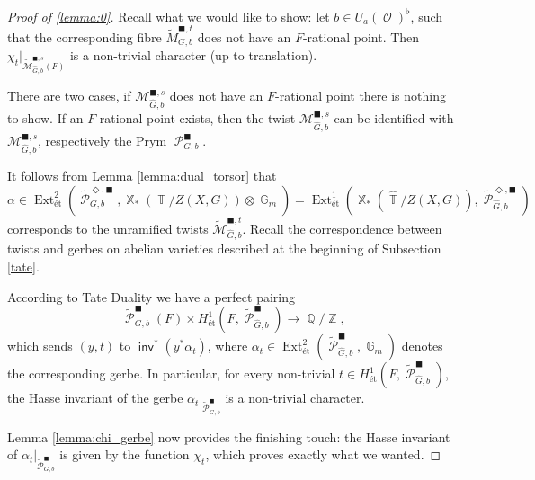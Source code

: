 \documentclass{article}
\DeclareMathOperator{\inv}{\mathsf{inv}}
\DeclareMathOperator{\Zb}{\mathbb{Z}}
\DeclareMathOperator{\Xb}{\mathbb{X}}
\DeclareMathOperator{\G}{\mathbb{G}}
\DeclareMathOperator{\Tb}{\mathbb{T}}
\newcommand{\Mc}{\mathcal{M}}
\DeclareMathOperator{\Pc}{\mathcal{P}}
\DeclareMathOperator{\Oo}{\mathcal{O}}
\DeclareMathOperator{\Qb}{\mathbb{Q}}
\DeclareMathOperator{\Ext}{Ext}
\theoremstyle{definition}
\theoremstyle{plain}
\newtheorem{lemma}[definition]{Lemma}
\begin{document}

\begin{proof}[Proof of \ref{lemma:0}]
Recall what we would like to show: let $b \in U_a(\Oo)^{\flat}$, such that the corresponding fibre $\widetilde{M}^{\blacksquare,t}_{G,b}$ does not have an $F$-rational point. Then $\chi_t|_{\widetilde{\Mc}^{\blacksquare,s}_{\widehat{G},b}(F)}$ is a non-trivial character (up to translation).

There are two cases, if $\Mc^{\blacksquare,s}_{\widehat{G},b}$ does not have an $F$-rational point there is nothing to show.
If an $F$-rational point exists, then the twist $\Mc^{\blacksquare,s}_{\widehat{G},b}$ can be identified with $\Mc^{\blacksquare,s}_{\widehat{G},b}$, respectively the Prym $\Pc_{G,b}^{\blacksquare}$. 

It follows from Lemma \ref{lemma:dual_torsor} that $\alpha \in \Ext_{\text{\'et}}^2(\widetilde{\Pc}_{G,b}^{\Diamond,\blacksquare},\Xb_*(\Tb/Z(X,G)) \otimes \G_m) = \Ext^1_{\text{\'et}}(\Xb_*(\widehat{\Tb}/Z(X,G)), \widetilde{\Pc}_{\widehat{G},b}^{\Diamond,\blacksquare})$ corresponds to the unramified twists $\widetilde{\Mc}^{\blacksquare,t}_{\widehat{G},b}$. Recall the correspondence between twists and gerbes on abelian varieties described at the beginning of Subsection \ref{tate}.

According to Tate Duality \cite[I.3.4]{MilneADT} we have a perfect pairing
$$\widetilde{\Pc}^{\blacksquare}_{{G},b}(F) \times H^1_{\text{\'et}}(F,\widetilde{\Pc}^{\blacksquare}_{\widehat{G},b}) \to \Qb/\Zb,$$ which sends $(y,t)$ to $\inv^*(y^*\alpha_t)$, where $\alpha_t \in \Ext^2_{\text{\'et}}(\widetilde{\Pc}^{\blacksquare}_{\widehat{G},b},\G_m)$ denotes the corresponding gerbe. In particular, for every non-trivial $t \in H^1_{\text{\'et}}(F,\widetilde{\Pc}^{\blacksquare}_{\widehat{G},b})$, the Hasse invariant of the gerbe $\alpha_t|_{\widetilde{\Pc}^{\blacksquare}_{{G},b}}$ is a non-trivial character.

Lemma \ref{lemma:chi_gerbe} now provides the finishing touch: the Hasse invariant of $\alpha_t|_{\widetilde{\Pc}^{\blacksquare}_{{G},b}}$ is given by the function $\chi_t$, which proves exactly what we wanted.
\end{proof}
\end{document}
